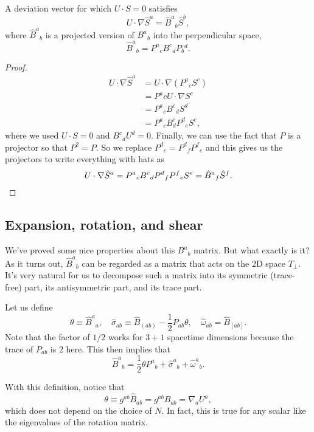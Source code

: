 \begin{prop}
    A deviation vector for which $U\cdot S=0$ satisfies
    \begin{equation}
        U\cdot \nabla \hat S^a = \hat B^a{}_b \hat S^b,
    \end{equation}
    where $\hat B^a{}_b$ is a projected version of $B^a{}_b$ into the perpendicular space,
    \begin{equation}
        \hat B^a{}_b=P^a{}_c B^c{}_d P_b{}^d.
    \end{equation}
\end{prop}
\begin{proof}
    \begin{align*}
        U\cdot \nabla \hat S^a &= U\cdot \nabla(P^a{}_c S^c)\\
            &= P^a{}c U\cdot \nabla S^c\\
            &= P^a{}_c B^c{}_d S^d\\
            &= P^a{}_c B^c_d P^d{}_e S^e,
    \end{align*}
    where we used $U\cdot S=0$ and $B^c{}_d U^d=0$. Finally, we can use the fact that $P$ is a projector so that $P^2=P$. So we replace $P^d{}_e=P^d{}_f P^f{}_e$ and this gives us the projectors to write everything with hats as
    \begin{equation*}
        U\cdot \nabla \hat S^a = P^a{}_c B^c{}_d P^d{}_f P^f{}_e S^e = \hat B^a{}_f \hat S^f. \qedhere
    \end{equation*}
\end{proof}

\subsection*{Expansion, rotation, and shear}
We've proved some nice properties about this $B^a{}_b$ matrix. But what exactly is it? As it turns out, $\hat B^a{}_b$ can be regarded as a matrix that acts on the $2$D space $T_\perp$. It's very natural for us to decompose such a matrix into its symmetric (trace-free) part, its antisymmetric part, and its trace part.
\begin{defn}
    Let us define
    \begin{equation}
        \theta \equiv \hat B^a{}_a, \quad \hat \sigma_{ab} \equiv \hat B_{(ab)}-\frac{1}{2} P_{ab} \theta, \quad \hat \omega_{ab} = \hat B_{[ab]}.
    \end{equation}
    Note that the factor of $1/2$ works for $3+1$ spacetime dimensions because the trace of $P_{ab}$ is $2$ here. This then implies that
    \begin{equation}
        \hat B^a{}_b = \frac{1}{2} \theta P^a{}_b +\hat \sigma^a{}_b +\hat \omega^a{}_b.
    \end{equation}
\end{defn}
With this definition, notice that
\begin{equation}
    \theta \equiv g^{ab} \hat B_{ab} = g^{ab} B_{ab} =\nabla_a U^a,
\end{equation}
which does not depend on the choice of $N$. In fact, this is true for any scalar like the eigenvalues of the rotation matrix.

